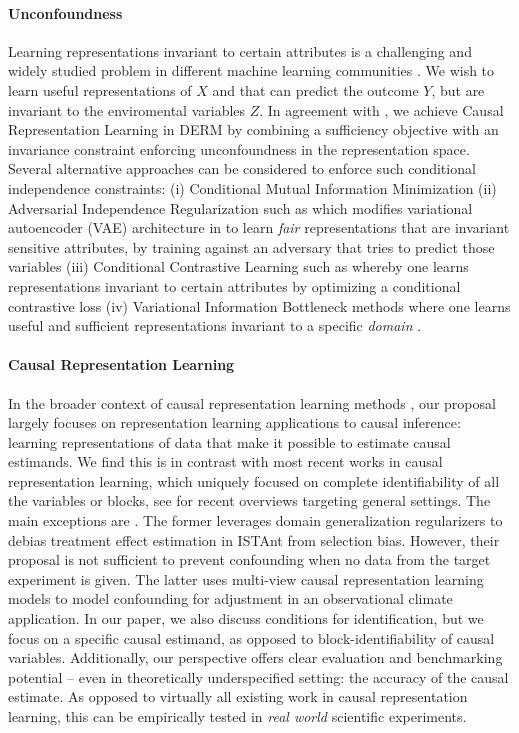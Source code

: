\paragraph{Unconfoundness} Learning representations invariant to certain attributes is a challenging and widely studied problem in different machine learning communities \citep{moyer2018invariant}. We wish to learn useful representations of $X$ and that can predict the outcome $Y$, but are invariant to the enviromental variables $Z$. In agreement with \citet{yao2024unifying}, we achieve Causal Representation Learning in DERM by combining a sufficiency objective with an invariance constraint enforcing unconfoundness in the representation space. Several alternative approaches can be considered to enforce such conditional independence constraints:  (i) Conditional Mutual Information Minimization \citep{song2019learning, cheng2020club, gupta2021controllable} (ii) Adversarial Independence Regularization such as \citet{louizos2015variational} which modifies variational autoencoder (VAE) architecture in \citet{kingma2014adam} to learn \textit{fair} representations that are invariant sensitive attributes, by training against an adversary that tries to predict those variables (iii) Conditional Contrastive Learning such as \citet{ma2021conditional} whereby one learns representations invariant to certain attributes by optimizing a conditional contrastive loss (iv) Variational Information Bottleneck methods where one learns useful and sufficient representations invariant to a specific \textit{domain} \cite{alemi2016deep, li2022invariant}.

\paragraph{Causal Representation Learning} In the broader context of causal representation learning methods \citep{scholkopf2021toward}, our proposal largely focuses on representation learning applications to causal inference: learning representations of data that make it possible to estimate causal estimands. We find this is in contrast with most recent works in causal representation learning, which uniquely focused on complete identifiability of all the variables or blocks, see \citet{yao2024unifying,varici2024general,von2024identifiable} for recent overviews targeting general settings. The main exceptions are \citet{yao2024unifying,yao2024marrying}. The former leverages domain generalization regularizers to debias treatment effect estimation in ISTAnt from selection bias. However, their proposal is not sufficient to prevent confounding when no data from the target experiment is given. The latter uses multi-view causal representation learning models to model confounding for adjustment in an observational climate application. In our paper, we also discuss conditions for identification, but we focus on a specific causal estimand, as opposed to block-identifiability of causal variables. Additionally, our perspective offers clear evaluation and benchmarking potential -- even in theoretically underspecified setting: the accuracy of the causal estimate. As opposed to virtually all existing work in causal representation learning, this can be empirically tested in \textit{real world} scientific experiments.